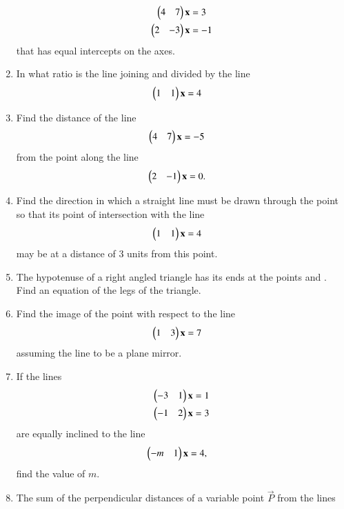 \begin{enumerate}[label=\arabic*.,ref=\thesubsection.\theenumi]
%
\begin{align}
\begin{pmatrix}4 & 7\end{pmatrix}\mathbf{x} &= 3
\\
\begin{pmatrix}2 & -3\end{pmatrix}\mathbf{x} &= -1
\end{align}
%
that has equal intercepts on the axes.
%
\item In what ratio is the line joining  and  divided by the line
%
\begin{align}
\begin{pmatrix}1 & 1\end{pmatrix}\mathbf{x} &= 4
\end{align}
%
\item Find the distance of the line 
%
\begin{align}
\begin{pmatrix}4 & 7\end{pmatrix}\mathbf{x} &= -5
\end{align}
%
from the point  along the line 
%
\begin{align}
\begin{pmatrix}2 & -1\end{pmatrix}\mathbf{x} &= 0.
\end{align}
%
\item Find the direction in which a straight line must be drawn through the point  so that its point of intersection with the line 
%
\begin{align}
\begin{pmatrix}1 & 1\end{pmatrix}\mathbf{x} &= 4
\end{align}
%
may be at a distance of 3 units from this point.
\item The hypotenuse of a right angled triangle has its ends at the points  and . Find an equation of the legs of the triangle.
\item Find the image of the point  with respect to the line 
%
\begin{align}
\begin{pmatrix}1 & 3\end{pmatrix}\mathbf{x} &= 7
\end{align}
%
assuming the line to be a plane mirror.
%
\item If the lines
%
%
\begin{align}
\begin{pmatrix}-3 & 1\end{pmatrix}\mathbf{x} &= 1
\\
\begin{pmatrix}-1 & 2\end{pmatrix}\mathbf{x} &= 3
\end{align}
%
are equally inclined to the line
%
\begin{align}
\begin{pmatrix}-m & 1\end{pmatrix}\mathbf{x} &= 4,
\end{align}
%
find the value of $m$.
%
\item The sum of the perpendicular distances of a variable point $\vec{P}$ from the lines

\end{enumerate}
